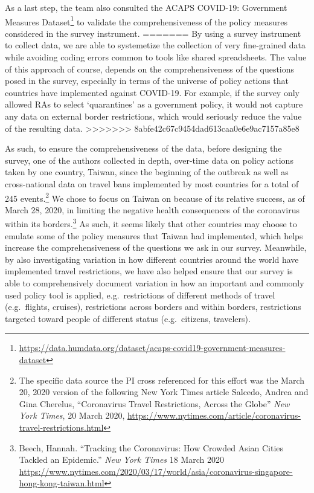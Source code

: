 \documentclass[]{article}
\let\rmarkdownfootnote\footnote%
\def\footnote{\protect\rmarkdownfootnote}
\begin{document}
As a last step, the team also consulted the ACAPS COVID-19: Government Measures Dataset\footnote{\url{https://data.humdata.org/dataset/acaps-covid19-government-measures-dataset}} to validate the comprehensiveness of the policy measures considered in the survey instrument.
=======
By using a survey instrument to collect data, we are able to systemetize the collection of very fine-grained data while avoiding coding errors common to tools like shared spreadsheets. The value of this approach of course, depends on the comprehensiveness of the questions posed in the survey, especially in terms of the universe of policy actions that countries have implemented against COVID-19. For example, if the survey only allowed RAs to select `quarantines' as a government policy, it would not capture any data on external border restrictions, which would seriously reduce the value of the resulting data.
>>>>>>> 8abfe42c67c9454dad613caa0e6e9ac7157a85e8

As such, to ensure the comprehensiveness of the data, before designing the survey, one of the authors collected in depth, over-time data on policy actions taken by one country, Taiwan, since the beginning of the outbreak as well as cross-national data on travel bans implemented by most countries for a total of 245 events.\footnote{The specific data source the PI cross referenced for this effort was the March 20, 2020 version of the following New York Times article Salcedo, Andrea and Gina Cherelus, ``Coronavirus Travel Restrictions, Across the Globe'' \emph{New York Times}, 20 March 2020, \url{https://www.nytimes.com/article/coronavirus-travel-restrictions.html}} We chose to focus on Taiwan on because of its relative success, as of March 28, 2020, in limiting the negative health consequences of the coronavirus within its borders.\footnote{Beech, Hannah. ``Tracking the Coronavirus: How Crowded Asian Cities Tackled an Epidemic.'' \emph{New York Times} 18 March 2020 \url{https://www.nytimes.com/2020/03/17/world/asia/coronavirus-singapore-hong-kong-taiwan.html}} As such, it seems likely that other countries may choose to emulate some of the policy measures that Taiwan had implemented, which helps increase the comprehensiveness of the questions we ask in our survey. Meanwhile, by also investigating variation in how different countries around the world have implemented travel restrictions, we have also helped ensure that our survey is able to comprehensively document variation in how an important and commonly used policy tool is applied, e.g.~restrictions of different methods of travel (e.g.~flights, cruises), restrictions across borders and within borders, restrictions targeted toward people of different status (e.g.~citizens, travelers).
\end{document}
